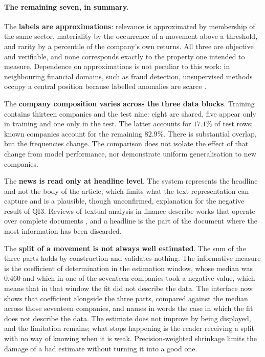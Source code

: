 \paragraph{The remaining seven, in summary.}
The \textbf{labels are approximations}: relevance is approximated by membership of the same sector,
materiality by the occurrence of a movement above a threshold, and rarity by a percentile of the
company's own returns. All three are objective and verifiable, and none corresponds exactly to the
property one intended to measure. Dependence on approximations is not peculiar to this work: in
neighbouring financial domains, such as fraud detection, unsupervised methods occupy a central
position because labelled anomalies are scarce \autocite{ahmed2016financial}.

The \textbf{company composition varies across the three data blocks}. Training contains thirteen
companies and the test nine: eight are shared, five appear only in training and one only in the
test. The latter accounts for $17.1\%$ of test rows; known companies account for the remaining
$82.9\%$. There is substantial overlap, but the frequencies change. The comparison does not isolate
the effect of that change from model performance, nor demonstrate uniform generalisation to new companies.

The \textbf{news is read only at headline level}. The system represents the headline and not the
body of the article, which limits what the text representation can capture and is a plausible,
though unconfirmed, explanation for the negative result of \gls{QI}3. Reviews of textual analysis in
finance describe works that operate over complete documents \autocite{kearney2014textual}, and a
headline is the part of the document where the most information has been discarded.

The \textbf{split of a movement is not always well estimated}. The sum of the three parts holds by
construction and validates nothing. The informative measure is the coefficient of determination in
the estimation window, whose median was $0.460$ and which in one of the seventeen companies took a
negative value, which means that in that window the fit did not describe the data.
The interface now shows that coefficient alongside the three parts, compared against the median
across those seventeen companies, and names in words the case in which the fit does not describe the data.
The estimate does not improve by being displayed, and the limitation remains; what stops
happening is the reader receiving a split with no way of knowing when it is weak. Precision-weighted shrinkage \autocite{vasicek1973beta} limits the damage of a bad
estimate without turning it into a good one.

